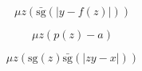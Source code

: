 \begin{exe}[5.4.1]
    \[\mu z (\bar{\text{sg}}(|y - f(z)|))\]
\end{exe}
\begin{exe}[5.4.2]
    \[\mu z (p(z) - a)\]
\end{exe}
\begin{exe}[5.4.2]
    \[\mu z (\text{sg}(z)\bar{\text{sg}}(|zy - x|))\]
\end{exe}

